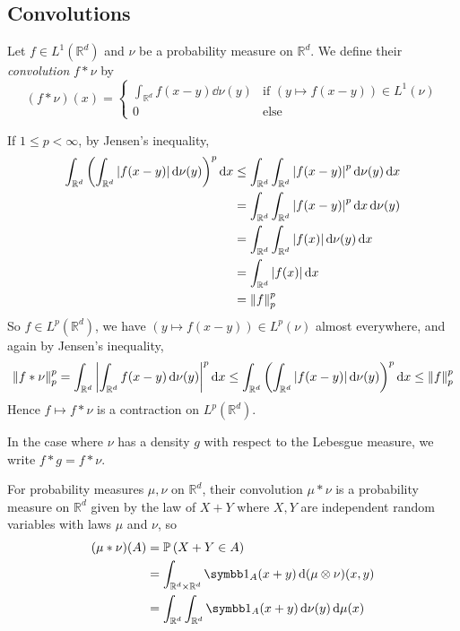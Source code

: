 \subsection{Convolutions}
\begin{definition}
	Let \( f \in L^1(\mathbb R^d) \) and \( \nu \) be a probability measure on \( \mathbb R^d \).
	We define their \emph{convolution} \( f \ast \nu \) by
	\[ (f \ast \nu)(x) = \begin{cases}
		\int_{\mathbb R^d} f(x-y) \dd{\nu(y)} & \text{if } (y \mapsto f(x-y)) \in L^1(\nu) \\
		0 & \text{else}
	\end{cases} \]
\end{definition}
\begin{remark}
	If \( 1 \leq p < \infty \), by Jensen's inequality,
	\begin{align*}
		\int_{\mathbb R^d} \qty( \int_{\mathbb R^d} \abs{f(x-y)} \dd{\nu(y)} )^p \dd{x} &\leq \int_{\mathbb R^d} \int_{\mathbb R^d} \abs{f(x-y)}^p \dd{\nu(y)} \dd{x} \\
		&= \int_{\mathbb R^d} \int_{\mathbb R^d} \abs{f(x-y)}^p \dd{x} \dd{\nu(y)} \\
		&= \int_{\mathbb R^d} \int_{\mathbb R^d} \abs{f(x)} \dd{\nu(y)} \dd{x} \\
		&= \int_{\mathbb R^d} \abs{f(x)} \dd{x} \\
		&= \norm{f}_p^p
	\end{align*}
	So \( f \in L^p(\mathbb R^d) \), we have \( (y \mapsto f(x-y)) \in L^p(\nu) \) almost everywhere, and again by Jensen's inequality,
	\[ \norm{f \ast \nu}_p^p = \int_{\mathbb R^d} \abs{ \int_{\mathbb R^d} f(x-y)\dd{\nu(y)} }^p \dd{x} \leq \int_{\mathbb R^d} \qty( \int_{\mathbb R^d} \abs{f(x-y)} \dd{\nu(y)} )^p \dd{x} \leq \norm{f}_p^p \]
	Hence \( f \mapsto f \ast \nu \) is a contraction on \( L^p(\mathbb R^d) \).
\end{remark}
In the case where \( \nu \) has a density \( g \) with respect to the Lebesgue measure, we write \( f \ast g = f \ast \nu \).
\begin{definition}
	For probability measures \( \mu, \nu \) on \( \mathbb R^d \), their convolution \( \mu \ast \nu \) is a probability measure on \( \mathbb R^d \) given by the law of \( X + Y \) where \( X, Y \) are independent random variables with laws \( \mu \) and \( \nu \), so
	\begin{align*}
		(\mu \ast \nu)(A) &= \prob{X+Y \in A} \\
		&= \int_{\mathbb R^d \times \mathbb R^d} \symbb 1_A(x+y) \dd{(\mu \otimes \nu)(x, y)} \\
		&= \int_{\mathbb R^d} \int_{\mathbb R^d} \symbb 1_A(x+y) \dd{\nu(y)} \dd{\mu(x)}
	\end{align*}
\end{definition}
